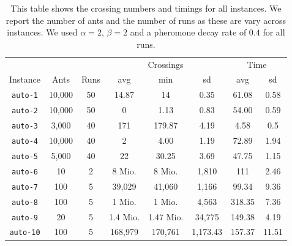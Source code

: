 \documentclass{scrartcl}
\begin{document}
\begin{table}[!H]
\scriptsize
\centering
\begin{tabular}{cccccccc}
\toprule
 & & & \multicolumn{3}{c}{Crossings} & \multicolumn{2}{c}{Time} \\
Instance & Ants & Runs & avg & min & sd & avg & sd \\
\midrule
\texttt{auto-1} & 10,000 & 50 & 14.87 & 14 & 0.35 & 61.08 & 0.58  \\
\texttt{auto-2} & 10,000 & 50 & 0 & 1.13 & 0.83 & 54.00 & 0.59 \\
\texttt{auto-3} & 3,000  & 40 & 171 & 179.87 & 4.19 & 4.58 & 0.5 \\
\texttt{auto-4} & 10,000 & 40 & 2 & 4.00 & 1.19 & 72.89 & 1.94 \\
\texttt{auto-5} & 5,000 & 40 & 22 & 30.25 & 3.69 & 47.75 & 1.15 \\
\texttt{auto-6} & 10 & 2 & 8 Mio. & 8 Mio. & 1,810 & 111 & 2.46 \\
\texttt{auto-7} & 100 & 5 & 39,029 & 41,060 & 1,166 & 99.34 & 9.36 \\
\texttt{auto-8} & 100 & 5 & 1 Mio. & 1 Mio.  & 4,563 & 318.35 & 7.36 \\
\texttt{auto-9} & 20 & 5 & 1.4 Mio. & 1.47 Mio. & 34,775 & 149.38 & 4.19 \\
\texttt{auto-10} & 100 & 5 & 168,979 & 170,761 & 1,173.43 & 157.37 & 11.51 \\
\bottomrule

\end{tabular}
\caption{This table shows the crossing numbers and timings for all
  instances. We report the number of ants and the number of runs as
  these are vary across instances. We used $\alpha=2$, $\beta=2$ and a
  pheromone decay rate of $0.4$ for all runs.}
\label{tab:results}
\end{table}

\clearpage
\end{document}
